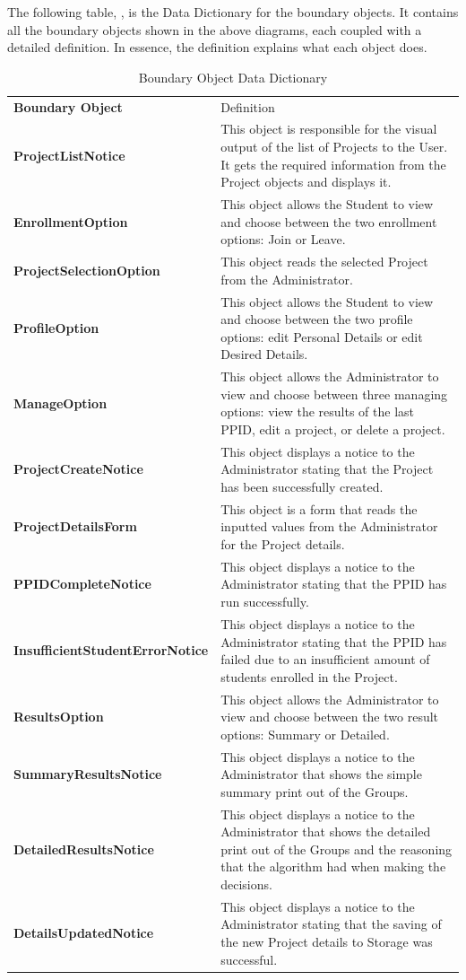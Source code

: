 \documentclass[12pt,letterpaper]{article}
\begin{document}
\newpage{}

The following table, , is the Data Dictionary for the boundary objects. It contains all the boundary objects shown in the above diagrams, each coupled with a detailed definition.
In essence, the definition explains what each object does.

\begin{table}[H]
    \caption{Boundary Object Data Dictionary}
	\begin{tabu} to 
		\tableheader{}Boundary Object & Definition\\
		ProjectListNotice & 
			This object is responsible for the visual output of the list of Projects to the User. It gets the required information from the Project objects and displays it.\\
		EnrollmentOption & 
			This object allows the Student to view and choose between the two enrollment options: Join or Leave.\\
		ProjectSelectionOption & 
			This object reads the selected Project from the Administrator.\\
		ProfileOption & 
			This object allows the Student to view and choose between the two profile options: edit Personal Details or edit Desired Details.\\
		ManageOption & 
			This object allows the Administrator to view and choose between three managing options: view the results of the last PPID, edit a project, or delete a project.\\
		ProjectCreateNotice & 
			This object displays a notice to the Administrator stating that the Project has been successfully created.\\
		ProjectDetailsForm & 
			This object is a form that reads the inputted values from the Administrator for the Project details.\\
		PPIDCompleteNotice & 
			This object displays a notice to the Administrator stating that the PPID has run successfully.\\
		InsufficientStudentErrorNotice & 
			This object displays a notice to the Administrator stating that the PPID has failed due to an insufficient amount of students enrolled in the Project.\\
		ResultsOption & 
			This object allows the Administrator to view and choose between the two result options: Summary or Detailed.\\
		SummaryResultsNotice & 
			This object displays a notice to the Administrator that shows the simple summary print out of the Groups.\\
		DetailedResultsNotice & 
			This object displays a notice to the Administrator that shows the detailed print out of the Groups and the reasoning that the algorithm had when making the decisions.\\
		DetailsUpdatedNotice & 
			This object displays a notice to the Administrator stating that the saving of the new Project details to Storage was successful.\\
	\end{tabu}
\end{table}
\end{document}
